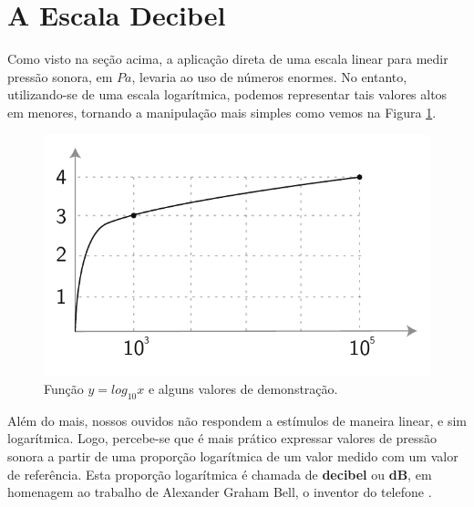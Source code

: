 \documentclass[
    12pt,               %
    openright,          %
    oneside,
    a4paper,            
    english,            %
    brazil              %
    ]{abntex2}
\begin{document}
\section{A Escala Decibel}\label{escala-db}

Como visto na seção acima, a aplicação direta de uma escala linear para medir pressão sonora, em $Pa$, levaria ao uso de números enormes. No entanto, utilizando-se de uma escala logarítmica, podemos representar tais valores altos em menores, tornando a manipulação mais simples como vemos na Figura \ref{log}. 

\begin{figure}[!htb]
  \caption{\label{log}Função $y=log_{10}x$ e alguns valores de demonstração.}
  \begin{center}
    \includegraphics[scale=0.6]{images/log.pdf}
  \end{center}
\end{figure}

Além do mais, nossos ouvidos não respondem a estímulos de maneira linear, e sim logarítmica. Logo, percebe-se que é mais prático expressar valores de pressão sonora a partir de uma proporção logarítmica de um valor medido com um valor de referência. Esta proporção logarítmica é chamada de \textbf{decibel} ou \textbf{dB}, em homenagem ao trabalho de Alexander Graham Bell, o inventor do telefone \cite{young}.
\end{document}
